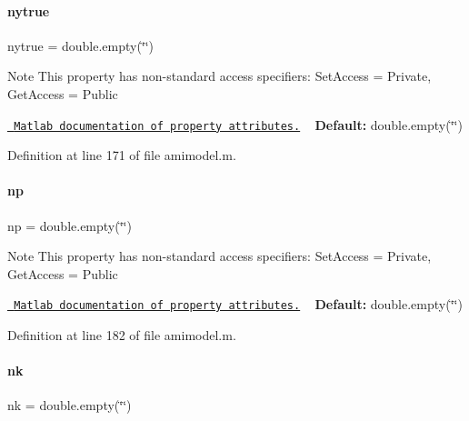 \paragraph{\texorpdfstring{nytrue}{nytrue}}
{\footnotesize\ttfamily nytrue = double.\+empty(\char`\"{}\char`\"{})}

\begin{DoxyNote}{Note}
This property has non-\/standard access specifiers\+: {\ttfamily Set\+Access = Private, Get\+Access = Public} 

\href{http://www.mathworks.com/help/matlab/matlab_oop/property-attributes.html}{\texttt{ Matlab documentation of property attributes.}} ~\newline
{\bfseries{Default\+:}} double.\+empty(\char`\"{}\char`\"{}) 
\end{DoxyNote}


Definition at line 171 of file amimodel.\+m.

\mbox{\label{classamimodel_a6f6e2fe71b05c4c2f2d967ce9ca02dfd}} 
\paragraph{\texorpdfstring{np}{np}}
{\footnotesize\ttfamily np = double.\+empty(\char`\"{}\char`\"{})}

\begin{DoxyNote}{Note}
This property has non-\/standard access specifiers\+: {\ttfamily Set\+Access = Private, Get\+Access = Public} 

\href{http://www.mathworks.com/help/matlab/matlab_oop/property-attributes.html}{\texttt{ Matlab documentation of property attributes.}} ~\newline
{\bfseries{Default\+:}} double.\+empty(\char`\"{}\char`\"{}) 
\end{DoxyNote}


Definition at line 182 of file amimodel.\+m.

\mbox{\label{classamimodel_afd6bea572754e0c3c320664bdccf0200}} 
\paragraph{\texorpdfstring{nk}{nk}}
{\footnotesize\ttfamily nk = double.\+empty(\char`\"{}\char`\"{})}

